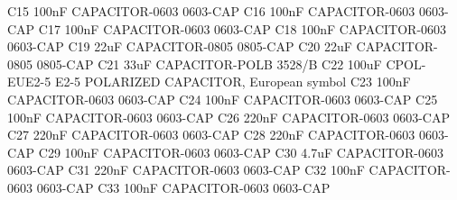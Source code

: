 \documentclass[11pt, a4paper]{article}[2009/11/13]
\begin{document}
C15     100nF         CAPACITOR-0603    0603-CAP                                                                                        
C16     100nF         CAPACITOR-0603    0603-CAP                                                                                        
C17     100nF         CAPACITOR-0603    0603-CAP                                                                                        
C18     100nF         CAPACITOR-0603    0603-CAP                                                                                        
C19     22uF          CAPACITOR-0805    0805-CAP                                                                                        
C20     22uF          CAPACITOR-0805    0805-CAP                                                                                        
C21     33uF          CAPACITOR-POLB    3528/B                                                                                          
C22     100uF         CPOL-EUE2-5       E2-5                  POLARIZED CAPACITOR, European symbol                                      
C23     100nF         CAPACITOR-0603    0603-CAP                                                                                        
C24     100nF         CAPACITOR-0603    0603-CAP                                                                                        
C25     100nF         CAPACITOR-0603    0603-CAP                                                                                        
C26     220nF         CAPACITOR-0603    0603-CAP                                                                                        
C27     220nF         CAPACITOR-0603    0603-CAP                                                                                        
C28     220nF         CAPACITOR-0603    0603-CAP                                                                                        
C29     100nF         CAPACITOR-0603    0603-CAP                                                                                        
C30     4.7uF         CAPACITOR-0603    0603-CAP                                                                                        
C31     220nF         CAPACITOR-0603    0603-CAP                                                                                        
C32     100nF         CAPACITOR-0603    0603-CAP                                                                                        
C33     100nF         CAPACITOR-0603    0603-CAP                                                                                        
\end{document}
